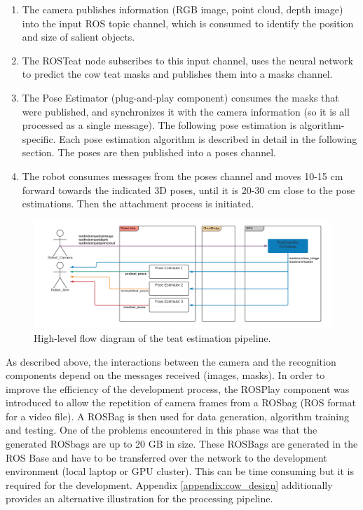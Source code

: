 \begin{enumerate}
    \item The camera publishes information (RGB image, point cloud, depth image) into the input ROS topic channel, which is consumed to identify the position and size of salient objects.
    \item The ROSTeat node subscribes to this input channel, uses the neural network to predict the cow teat masks and publishes them into a masks channel.
    \item The Pose Estimator (plug-and-play component) consumes the masks that were published, and synchronizes it with the camera information (so it is all processed as a single message). The following pose estimation is algorithm-specific. Each pose estimation algorithm is described in detail in the following section. The poses are then published into a poses channel.
    \item The robot consumes messages from the poses channel and moves 10-15 cm forward towards the indicated 3D poses, until it is 20-30 cm close to the pose estimations. Then the attachment process is initiated.
\end{enumerate}

\begin{figure}[!ht]
    \centering
    \includegraphics[width=1\textwidth]{images/cow_topics.png}
    \caption{High-level flow diagram of the teat estimation pipeline.}
    \label{fig:cow_topics}
\end{figure}



As described above, the interactions between the camera and the recognition components depend on the messages received (images, masks). In order to improve the efficiency of the development process, the ROSPlay component was introduced to allow the repetition of camera frames from a ROSbag (ROS format for a video file). A ROSBag is then used for data generation, algorithm training and testing. One of the problems encountered in this phase was that the generated ROSbags are up to 20 GB in size. These ROSBags are generated in the ROS Base and have to be transferred over the network to the development environment (local laptop or GPU cluster). This can be time consuming but it is required for the development.  
Appendix \ref{appendix:cow_design} additionally provides an alternative illustration for the processing pipeline.